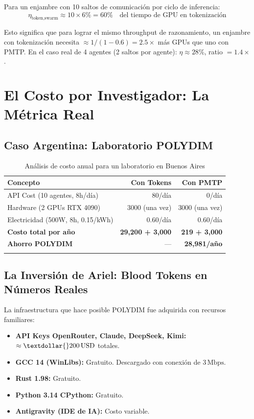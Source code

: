 ﻿\documentclass{article}
\begin{document}
Para un enjambre con 10 saltos de comunicación por ciclo de inferencia:
\begin{equation}
\eta_{\text{token,swarm}} \approx 10 \times 6\% = 60\% \quad \text{del tiempo de GPU en tokenización}
\end{equation}

Esto significa que para lograr el mismo throughput de razonamiento, un enjambre
con tokenización necesita $\approx 1/(1-0.6) = 2.5\times$ más GPUs que uno con PMTP.
En el caso real de 4 agentes (2 saltos por agente): $\eta \approx 28\%$, ratio $= 1.4\times$.

\section{El Costo por Investigador: La Métrica Real}

\subsection{Caso Argentina: Laboratorio POLYDIM}

\begin{longtable}{lrr}
\toprule
\textbf{Concepto} & \textbf{Con Tokens} & \textbf{Con PMTP} \\
\midrule
API Cost (10 agentes, 8h/día) & \textdollar{}80/día & \textdollar{}0/día \\
Hardware (2 GPUs RTX 4090) & \textdollar{}3000 (una vez) & \textdollar{}3000 (una vez) \\
Electricidad (500W, 8h, \textdollar{}0.15/kWh) & \textdollar{}0.60/día & \textdollar{}0.60/día \\
\midrule
\textbf{Costo total por año} & \textbf{\textdollar{}29,200 + \textdollar{}3,000} & \textbf{\textdollar{}219 + \textdollar{}3,000} \\
\textbf{Ahorro POLYDIM} & --- & \textbf{\textdollar{}28,981/año} \\
\bottomrule
\caption{Análisis de costo anual para un laboratorio en Buenos Aires}
\label{tab:costo_latam}
\end{longtable}

\subsection{La Inversión de Ariel: Blood Tokens en Números Reales}

La infraestructura que hace posible POLYDIM fue adquirida con recursos familiares:
\begin{itemize}
\item \textbf{API Keys OpenRouter, Claude, DeepSeek, Kimi:} $\approx \textdollar{}200\,\text{USD}$ totales.
\item \textbf{GCC 14 (WinLibs):} Gratuito. Descargado con conexión de $3\,\text{Mbps}$.
\item \textbf{Rust 1.98:} Gratuito.
\item \textbf{Python 3.14 CPython:} Gratuito.
\item \textbf{Antigravity (IDE de IA):} Costo variable.
\end{itemize}
\end{document}
